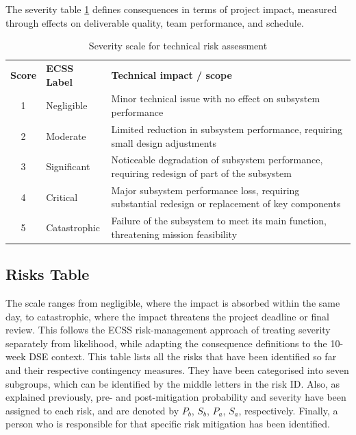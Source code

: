 \vspace*{-0.4cm}
\noindent The severity table \ref{tab:severity} defines consequences in terms of project impact, measured through effects on deliverable quality, team performance, and schedule. 



\begin{table}[H]
\centering
\footnotesize
\renewcommand{\arraystretch}{1.3}
\setlength{\tabcolsep}{8pt}
\begin{tabular}{c l p{8.5cm}}
\rowcolor{gray!20}
\textbf{Score} & \textbf{ECSS Label} & \textbf{Technical impact / scope} \\

\rowcolor{green!20}
1 & Negligible & Minor technical issue with no effect on subsystem performance \\

\rowcolor{lime!30}
2 & Moderate & Limited reduction in subsystem performance, requiring small design adjustments \\

\rowcolor{yellow!30}
3 & Significant & Noticeable degradation of subsystem performance, requiring redesign of part of the subsystem \\

\rowcolor{orange!40}
4 & Critical & Major subsystem performance loss, requiring substantial redesign or replacement of key components \\

\rowcolor{red!40}
5 & Catastrophic & Failure of the subsystem to meet its main function, threatening mission feasibility \\

\end{tabular}
\caption{Severity scale for technical risk assessment}
\label{tab:severity}
\end{table}

\subsection{Risks Table}
\label{sec:riskstable}

The scale ranges from negligible, where the impact is absorbed within the same day, to catastrophic, where the impact threatens the project deadline or final review. This follows the ECSS risk-management approach of treating severity separately from likelihood, while adapting the consequence definitions to the 10-week DSE context\cite{ECSS_M_ST_80C_2008}. This table lists all the risks that have been identified so far and their respective contingency measures. They have been categorised into seven subgroups, which can be identified by the middle letters in the risk ID. Also, as explained previously, pre- and post-mitigation probability and severity have been assigned to each risk, and are denoted by $P_b$, $S_b$, $P_a$, $S_a$, respectively. Finally, a person who is responsible for that specific risk mitigation has been identified.

